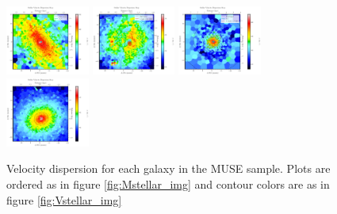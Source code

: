 \begin{figure}
      \centering
      \includegraphics[width=0.245\textwidth]{Mmaps/ic1459_stellar_sigma.png}
      \includegraphics[width=0.245\textwidth]{Mmaps/ngc1316_stellar_sigma.png}
      \includegraphics[width=0.245\textwidth]{Mmaps/ic4296_stellar_sigma.png}
      \includegraphics[width=0.245\textwidth]{Mmaps/ngc1399_stellar_sigma.png}
      \caption[MUSE velocity dispersion]{Velocity dispersion for each galaxy in the MUSE sample. Plots are ordered as in figure \ref{fig:Mstellar_img} and contour colors are as in figure \ref{fig:Vstellar_img}}
      \label{fig:Mstellar_sigma}
\end{figure}


